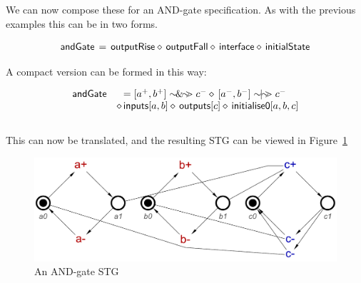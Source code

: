 \documentclass[british,conference,compsoc]{IEEEtran}
\begin{document}
\noindent We can now compose these for an AND-gate specification. As with the previous examples
this can be in two forms.

\[
\begin{array}{lcl}
\mathsf{andGate}&\hspace{-2mm}=&\hspace{-2mm}\mathsf{outputRise} \diamond\, \mathsf{outputFall} \diamond\, \mathsf{interface} 
\diamond\, \mathsf{initialState}
\end{array}
\]

\noindent A compact version can be formed in this way:

 \[
\begin{array}{lcl}
\mathsf{andGate}&\hspace{-2mm}=[a^{+}, b^{+}] \sim\hspace{-1.5mm}\&\hspace{-1.5mm}\sim\hspace{-1.5mm}> c^{-} \diamond\, [a^{-}, b^{-}] \sim\hspace{-1.5mm}|\hspace{-1.5mm}\sim\hspace{-1.5mm}> c^{-} \\
&\diamond\, \mathsf{inputs}[a, b] \diamond\, \mathsf{outputs}[c] \diamond\, \mathsf{initialise0} [a, b, c]
\end{array}
\]
\\
\noindent This can now be translated, and the resulting STG can be viewed in Figure~\ref{fig:and-gate-stg}


\begin{figure}[h]
\begin{centering}
\includegraphics[scale=0.25]{Images/and-gate-stg}
\par\end{centering}
\protect\caption{\label{fig:and-gate-stg} An AND-gate STG}
\end{figure}
\end{document}

